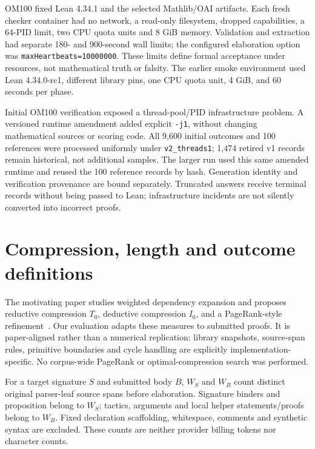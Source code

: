 \documentclass[11pt]{article}
\begin{document}
OM100 fixed Lean 4.34.1 and the selected Mathlib/OAI artifacts. Each fresh checker container had no network, a read-only filesystem, dropped capabilities, a 64-PID limit, two CPU quota units and 8 GiB memory. Validation and extraction had separate 180- and 900-second wall limits; the configured elaboration option was \texttt{maxHeartbeats=10000000}. These limits define formal acceptance under resources, not mathematical truth or falsity. The earlier smoke environment used Lean 4.34.0-rc1, different library pins, one CPU quota unit, 4 GiB, and 60 seconds per phase.

Initial OM100 verification exposed a thread-pool/PID infrastructure problem. A versioned runtime amendment added explicit \texttt{-j1}, without changing mathematical sources or scoring code. All 9,600 initial outcomes and 100 references were processed uniformly under \texttt{v2\_threads1}; 1,474 retired v1 records remain historical, not additional samples. The larger run used this same amended runtime and reused the 100 reference records by hash. Generation identity and verification provenance are bound separately. Truncated answers receive terminal records without being passed to Lean; infrastructure incidents are not silently converted into incorrect proofs.

\section{Compression, length and outcome definitions}
\label{sec:methods-measures}

The motivating paper studies weighted dependency expansion and proposes reductive compression $T_0$, deductive compression $I_0$, and a PageRank-style refinement~\cite{compression}. Our evaluation adapts these measures to submitted proofs. It is paper-aligned rather than a numerical replication: library snapshots, source-span rules, primitive boundaries and cycle handling are explicitly implementation-specific. No corpus-wide PageRank or optimal-compression search was performed.

For a target signature $S$ and submitted body $B$, $W_S$ and $W_B$ count distinct original parser-leaf source spans before elaboration. Signature binders and proposition belong to $W_S$; tactics, arguments and local helper statements/proofs belong to $W_B$. Fixed declaration scaffolding, whitespace, comments and synthetic syntax are excluded. These counts are neither provider billing tokens nor character counts.
\end{document}
